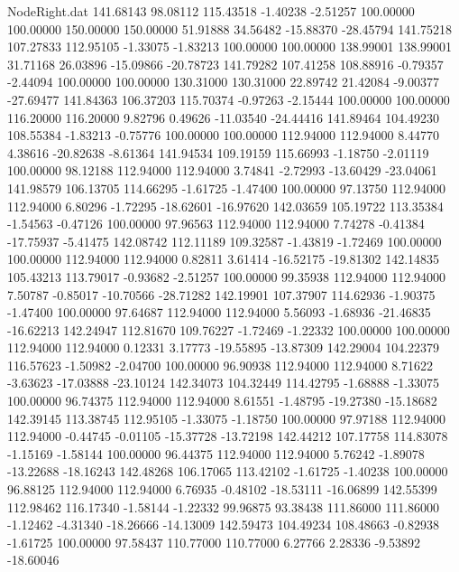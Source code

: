 \begin{filecontents}{NodeRight.dat}
 141.68143   98.08112  115.43518    -1.40238   -2.51257  100.00000  100.00000  150.00000  150.00000   51.91888   34.56482  -15.88370  -28.45794
 141.75218  107.27833  112.95105    -1.33075   -1.83213  100.00000  100.00000  138.99001  138.99001   31.71168   26.03896  -15.09866  -20.78723
 141.79282  107.41258  108.88916    -0.79357   -2.44094  100.00000  100.00000  130.31000  130.31000   22.89742   21.42084   -9.00377  -27.69477
 141.84363  106.37203  115.70374    -0.97263   -2.15444  100.00000  100.00000  116.20000  116.20000    9.82796    0.49626  -11.03540  -24.44416
 141.89464  104.49230  108.55384    -1.83213   -0.75776  100.00000  100.00000  112.94000  112.94000    8.44770    4.38616  -20.82638   -8.61364
 141.94534  109.19159  115.66993    -1.18750   -2.01119  100.00000   98.12188  112.94000  112.94000    3.74841   -2.72993  -13.60429  -23.04061
 141.98579  106.13705  114.66295    -1.61725   -1.47400  100.00000   97.13750  112.94000  112.94000    6.80296   -1.72295  -18.62601  -16.97620
 142.03659  105.19722  113.35384    -1.54563   -0.47126  100.00000   97.96563  112.94000  112.94000    7.74278   -0.41384  -17.75937   -5.41475
 142.08742  112.11189  109.32587    -1.43819   -1.72469  100.00000  100.00000  112.94000  112.94000    0.82811    3.61414  -16.52175  -19.81302
 142.14835  105.43213  113.79017    -0.93682   -2.51257  100.00000   99.35938  112.94000  112.94000    7.50787   -0.85017  -10.70566  -28.71282
 142.19901  107.37907  114.62936    -1.90375   -1.47400  100.00000   97.64687  112.94000  112.94000    5.56093   -1.68936  -21.46835  -16.62213
 142.24947  112.81670  109.76227    -1.72469   -1.22332  100.00000  100.00000  112.94000  112.94000    0.12331    3.17773  -19.55895  -13.87309
 142.29004  104.22379  116.57623    -1.50982   -2.04700  100.00000   96.90938  112.94000  112.94000    8.71622   -3.63623  -17.03888  -23.10124
 142.34073  104.32449  114.42795    -1.68888   -1.33075  100.00000   96.74375  112.94000  112.94000    8.61551   -1.48795  -19.27380  -15.18682
 142.39145  113.38745  112.95105    -1.33075   -1.18750  100.00000   97.97188  112.94000  112.94000   -0.44745   -0.01105  -15.37728  -13.72198
 142.44212  107.17758  114.83078    -1.15169   -1.58144  100.00000   96.44375  112.94000  112.94000    5.76242   -1.89078  -13.22688  -18.16243
 142.48268  106.17065  113.42102    -1.61725   -1.40238  100.00000   96.88125  112.94000  112.94000    6.76935   -0.48102  -18.53111  -16.06899
 142.55399  112.98462  116.17340    -1.58144   -1.22332   99.96875   93.38438  111.86000  111.86000   -1.12462   -4.31340  -18.26666  -14.13009
 142.59473  104.49234  108.48663    -0.82938   -1.61725  100.00000   97.58437  110.77000  110.77000    6.27766    2.28336   -9.53892  -18.60046

\end{filecontents}

